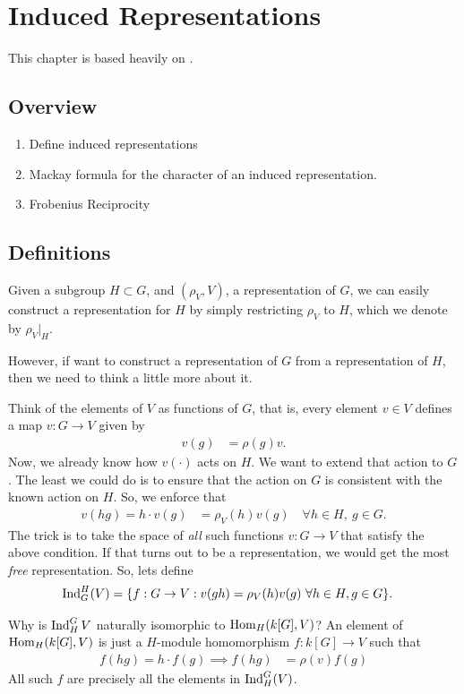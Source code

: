 \chapter{Induced Representations}
\label{cha:induced_reprentations}

This chapter is based heavily on \cite{etingof_introduction_2009}.
\section{Overview}
\begin{enumerate}
    \makethislistcompact
    \item Define induced representations
    \item Mackay formula for the character of an induced representation.
    \item Frobenius Reciprocity
\end{enumerate}

\section{Definitions}


Given a subgroup $H\subset G$, and $(\rho_V, V)$, a representation of $G$, we can easily construct a representation for $H$ by simply restricting $\rho_V$ to $H$, which we denote by $\rho_V|_H$.

However, if want to construct a representation of $G$ from a representation of $H$, then we need to think a little more about it. 

Think of the elements of $V$ as functions of $G$, that is, every element $v\in V$ defines a map $v: G\to V$ given by
\begin{align}
    v(g) &= \rho(g) v.
\end{align}
Now, we already know how $v(\cdot)$ acts on $H$. We want to extend that action to $G$. The least we could do is to ensure that the action on $G$ is consistent with the known action on $H$. So, we enforce that
\begin{align}
    v(hg) = h\cdot v(g) &= \rho_V(h) v(g)\quad \forall h\in H,\ g\in G.
\end{align}
The trick is to take the space of \emph{all} such functions $v: G\to V$ that satisfy the above condition. If that turns out to be a representation, we would get the most \emph{free} representation. So, lets define 
\begin{align}
    \operatorname{Ind}_G^H(V) &= \{f: G\to V : v(gh)=\rho_V(h)v(g)\ \forall h\in H, g\in G\}.
\end{align}



\pagebreak
\begin{insight}
    Why is $\operatorname{Ind}_H^G{V}$ naturally isomorphic to $\operatorname{Hom}_H(k[G],V)$?
    An element of $\operatorname{Hom}_H(k[G],V)$ is just a $H$-module homomorphism $f: k[G]\to V$ such that
    \begin{align}
        f(hg)  = h\cdot f(g)
        \implies f(hg) &= \rho(v) f(g)
    \end{align}
    All such $f$ are precisely all the elements in $\operatorname{Ind}_H^G(V)$.
\end{insight}
